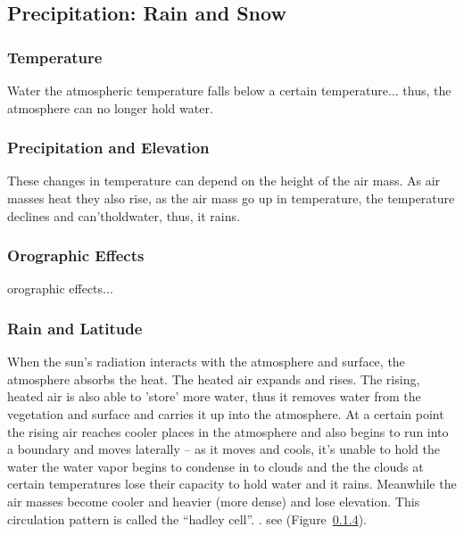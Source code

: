 \subsection{Precipitation: Rain and Snow}

\subsubsection{Temperature}

Water the atmospheric temperature falls below a certain temperature... 
thus, the atmosphere can no longer hold water. 

\subsubsection{Precipitation and Elevation}

These changes in temperature can depend on the height of the air mass. As air masses heat they also rise, as the air mass go up in temperature, the temperature declines and can'tholdwater, thus, it rains.


\subsubsection{Orographic Effects}


\Gls{orographic effects}...

\subsubsection{Rain and Latitude}

When the sun's radiation interacts with the atmosphere and surface, the atmosphere absorbs the heat. The heated air expands and rises. The rising, heated air is also able to 'store' more water, thus it removes water from the vegetation and surface and carries it up into the atmosphere. At a certain point the rising air reaches cooler places in the atmosphere and also begins to run into a boundary and moves laterally -- as it moves and cools, it's unable to hold the water the water vapor begins to condense in to clouds and the the clouds at certain temperatures lose their capacity to hold water and it rains. Meanwhile the air masses become cooler and heavier (more dense) and lose elevation. This circulation pattern is called the ``hadley cell''. . see (Figure~\ref{}). 



